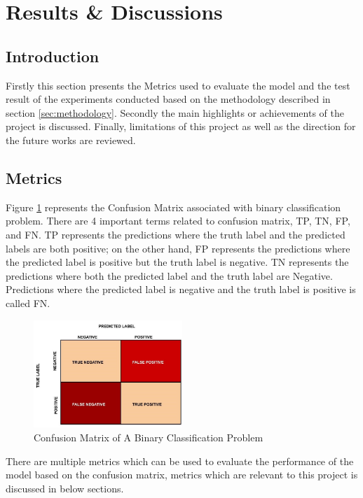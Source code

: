 \documentclass[twoside,11pt,a4paper]{article}
\begin{document}
\section{Results \& Discussions}\label{sec:results_discussions}

\subsection{Introduction}
Firstly this section presents the Metrics used to evaluate the model and the test result of the experiments conducted based on the methodology described in section \ref{sec:methodology}. Secondly the main highlights or achievements of the project is discussed. Finally, limitations of this project as well as the direction for the future works are reviewed.\\
\subsection{Metrics}
Figure \ref{fig:confusion_matrix} represents the Confusion Matrix associated with binary classification problem. There are 4 important terms related to confusion matrix, \acf{TP}, \acf{TN}, \acf{FP}, and \acf{FN}. \acs{TP} represents the predictions where the truth label and the predicted labels are both positive; on the other hand, \acs{FP} represents the predictions where the  predicted label is positive but the truth label is negative. \acs{TN} represents the predictions where both the predicted label and the truth label are Negative. Predictions where the predicted label is negative and the truth label is positive is called \acs{FN}.\\
\begin{figure}[ht]
	\centering
	\includegraphics[width=0.5\textwidth]{confusion_matrix}
	\caption[Confusion Matrix of A Binary Classification Problem]{Confusion Matrix of A Binary Classification Problem\citep{confusion_matrix}}
	\label{fig:confusion_matrix}
\end{figure}
\FloatBarrier
There are multiple metrics which can be used to evaluate the performance of the model based on the confusion matrix, metrics which are relevant to this project is discussed in below sections.
\end{document}
